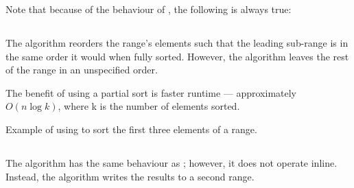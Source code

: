 Note that because of the behaviour of , the following is always true:\\
\begin{small}\end{small}

\subsection{\texorpdfstring{}{\texttt{std::partial\_sort}}}

The  algorithm reorders the range's elements such that the leading sub-range is in the same order it would when fully sorted. However, the algorithm leaves the rest of the range in an unspecified order.



The benefit of using a partial sort is faster runtime — approximately $O(n \log k)$, where k is the number of elements sorted.

\begin{codebox}[]{\href{https://compiler-explorer.com/z/j6xjM4GnT}{\ExternalLink}}
\footnotesize Example of using  to sort the first three elements of a range.
\tcblower
{}
\end{codebox}

\subsection{\texorpdfstring{}{\texttt{std::partial\_sort\_copy}}}

The  algorithm has the same behaviour as \linebreak{}; however, it does not operate inline. Instead, the algorithm writes the results to a second range.


